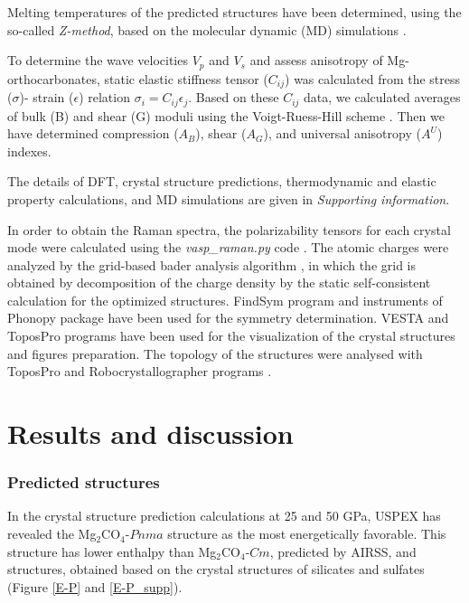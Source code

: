 \documentclass[a4paperm]{article}
\begin{document}
Melting temperatures of the predicted structures have been determined, using the so-called {\it Z-method}, based on the molecular dynamic (MD) simulations \cite{z-method}.

To determine the wave velocities $V_p$ and $V_s$ and assess anisotropy of Mg-orthocarbonates, static elastic stiffness tensor ($C_{ij}$) was calculated from the stress ($\sigma$)- strain ($\epsilon$) relation $\sigma_i=C_{ij}\epsilon_j$.
Based on these $C_{ij}$ data, we calculated averages of bulk (B) and shear (G) moduli using the Voigt-Ruess-Hill scheme \cite{hill1952,hill1963}.
 Then we have determined compression ($A_B$), shear ($A_G$), and universal anisotropy ($A^U$) indexes.

The details of DFT, crystal structure predictions, thermodynamic and elastic property calculations, and MD simulations are given in {\it Supporting information}.

In order to obtain the Raman spectra, the polarizability tensors for each crystal mode were calculated using the \textit{vasp{\_}raman.py} code \cite{vasp_raman}. 
The atomic charges were analyzed by the grid-based bader analysis algorithm \cite{bader_1,bader_2}, in which the grid is obtained by decomposition of the charge density by the static self-consistent calculation for the optimized structures.
FindSym program \cite{stokes2005} and instruments of Phonopy package have been used for the symmetry determination.
VESTA and ToposPro \cite{vesta,topos} programs have been used for the visualization of the crystal structures and figures preparation.
The topology of the structures were analysed with ToposPro and Robocrystallographer programs \cite{topos,robocrys}.
 

			\section*{Results and discussion}
 
\subsubsection*{Predicted structures}
In the crystal structure prediction calculations at 25 and 50 GPa, USPEX has revealed the Mg$_2$CO$_4$-$Pnma$ structure as the most energetically favorable.
This structure has lower enthalpy than Mg$_2$CO$_4$-$Cm$, predicted by AIRSS, and structures, obtained based on the crystal structures of silicates and sulfates (Figure \ref{E-P} and \ref{E-P_supp}).
\end{document}
